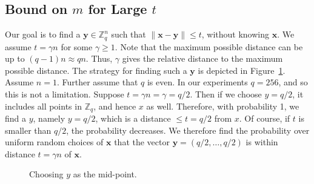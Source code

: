 \documentclass[pdflatex,sn-mathphys-num]{sn-jnl}
\theoremstyle{definition}
\newcommand{\vtr}[1]{\mathbf{#1}}
\newcommand{\norm}[1]{\lVert{#1}\rVert}
\begin{document}
\subsection{\texorpdfstring{Bound on $m$ for Large $t$}{Bound on m for Large t}}
Our goal is to find a $\vtr{y} \in \mathbb{Z}_q^n$ such that $\norm{\vtr{x} - \vtr{y}} \leq t$, without knowing $\vtr{x}$. We assume $t = \gamma n$ for some $\gamma \ge 1$. Note that the maximum possible distance can be up to $(q-1)n \approx qn$. Thus, $\gamma$ gives the relative distance to the maximum possible distance. The strategy for finding such a $\vtr{y}$ is depicted in Figure~\ref{fig:midpoint}. Assume $n = 1$. Further assume that $q$ is even. In our experiments $q = 256$, and so this is not a limitation. Suppose $t = \gamma n = \gamma = q/2$. Then if we choose  $y = q/2$, it includes all points in $\mathbb{Z}_q$, and hence $x$ as well. Therefore, with probability 1, we find a $y$, namely $y = q/2$, which is a distance $\leq t = q/2$ from $x$. Of course, if $t$ is smaller than $q/2$, the probability decreases. We therefore find the probability over uniform random choices of $\vtr{x}$ that the vector $\vtr{y} = (q/2, \ldots, q/2)$ is within distance $t = \gamma n$ of $\vtr{x}$. 

\begin{figure}
\centering
{}
\caption{Choosing $y$ as the mid-point.}
\label{fig:midpoint}
\end{figure}
\end{document}
